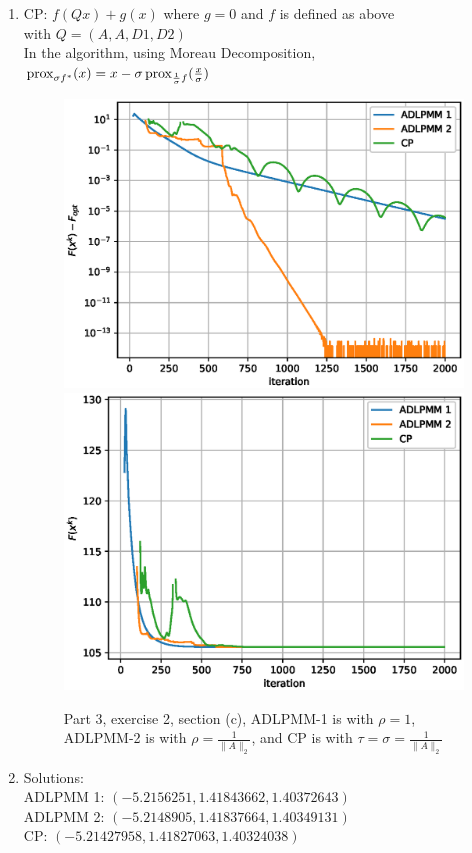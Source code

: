 \begin{enumerate}
    \item CP: $f(Qx) + g(x)$ where $g=0$ and $f$ is defined as above\\
    with $Q = (A, A, D1, D2)$\\
    In the algorithm, using Moreau Decomposition, $\operatorname{prox}_{\sigma f^*}(x) = x - \sigma \operatorname{prox}_{\frac{1}{\sigma}f}(\frac{x}{\sigma})$\\
    \begin{figure}[h]
        \centering
        \includegraphics[scale=0.5]{codes/result_images/ex_p3_e2_1_1_results.eps}
        \includegraphics[scale=0.5]{codes/result_images/ex_p3_e2_1_2_results.eps}
        \caption{Part 3, exercise 2, section (c), ADLPMM-1 is with $\rho=1$, ADLPMM-2 is with $\rho=\frac{1}{\|A\|_2}$, and CP is with $\tau=\sigma=\frac{1}{\|A\|_2}$}
        \label{fig:p3e1_1}
    \end{figure}


    \item  Solutions:\\
    ADLPMM 1: $(-5.2156251, 1.41843662, 1.40372643)$\\
    ADLPMM 2: $(-5.2148905, 1.41837664, 1.40349131)$\\
    CP: $(-5.21427958, 1.41827063, 1.40324038)$\\
\end{enumerate}

